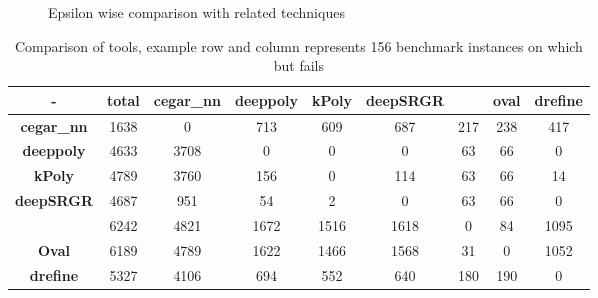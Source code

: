

\begin{figure}[t]

    \caption{Epsilon wise comparison with related techniques}
    \label{res:ep:milp_with_milp}
\end{figure}

\begin{table}
    \centering
    \begin{tabular}{|c|c|c|c|c|c|c|c|c|}
        \hline
        - & \textbf{total} & \textbf{cegar\_nn} & \textbf{deeppoly} & \textbf{kPoly} & \textbf{deepSRGR} & \alphabeta{} & \textbf{oval} & \textbf{drefine} \\
        \hline
        \textbf{cegar\_nn} & 1638 & 0 & 713 & 609 & 687 & 217 & 238 & 417 \\ 
        \hline
        \textbf{deeppoly} & 4633 & 3708 & 0 & 0 & 0 & 63 & 66 & 0  \\ 
        \hline
        \textbf{kPoly} & 4789 & 3760 & 156 & 0 & 114 & 63 & 66 & 14  \\ 
        \hline
        \textbf{deepSRGR} & 4687 & 951 & 54 & 2 & 0 & 63 & 66 & 0 \\ 
        \hline
        \alphabeta{} & 6242 & 4821 & 1672 & 1516 & 1618 & 0 & 84 & 1095  \\
        \hline
        \textbf{Oval} & 6189 & 4789 & 1622 & 1466 & 1568 & 31 & 0 & 1052 \\
        \hline
        \textbf{drefine} & 5327 & 4106 & 694 & 552 & 640 & 180 & 190 & 0  \\
        \hline
    \end{tabular}
    \caption{Comparison of tools, example row \kpoly{} and column \deeppoly{} represents 156 benchmark instances on which \kpoly{} but \deeppoly{} fails}
    \label{tb:matrix}
\end{table}
